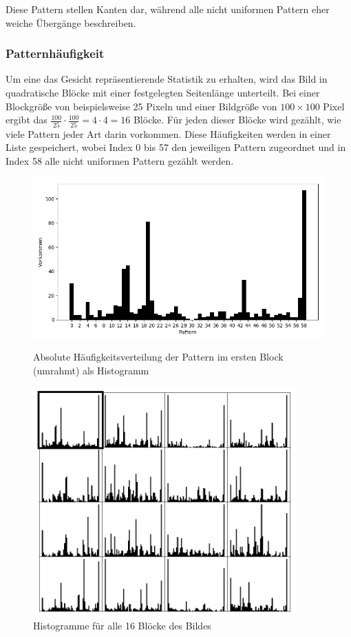 \documentclass[12pt, a4paper]{article}
\begin{document}
 Diese Pattern stellen Kanten dar, während alle nicht uniformen Pattern eher weiche Übergänge beschreiben.

\subsubsection{Patternhäufigkeit}
\label{sec:patternhaufigkeit}

Um eine das Gesicht repräsentierende Statistik zu erhalten, wird das Bild in quadratische Blöcke mit einer festgelegten Seitenlänge unterteilt. Bei einer Blockgröße von beispielsweise 25 Pixeln und einer Bildgröße von \(100 \times 100\) Pixel ergibt das \(\frac{100}{25} \cdot \frac{100}{25} = 4 \cdot 4 = 16\) Blöcke. Für jeden dieser Blöcke wird gezählt, wie viele Pattern jeder Art darin vorkommen. Diese Häufigkeiten werden in einer Liste gespeichert, wobei Index 0 bis 57 den jeweiligen Pattern zugeordnet und in Index 58 alle nicht uniformen Pattern gezählt werden.

\begin{figure}
	\centering
	\includegraphics[width=\textwidth]{lbp_histogram_single}
	\caption{Absolute Häufigkeitsverteilung der Pattern im ersten Block (umrahmt) als Histogramm}
	\includegraphics[width=0.9\textwidth]{lbp_histograms}
	\caption{Histogramme für alle 16 Blöcke des Bildes}
\end{figure}
\end{document}
